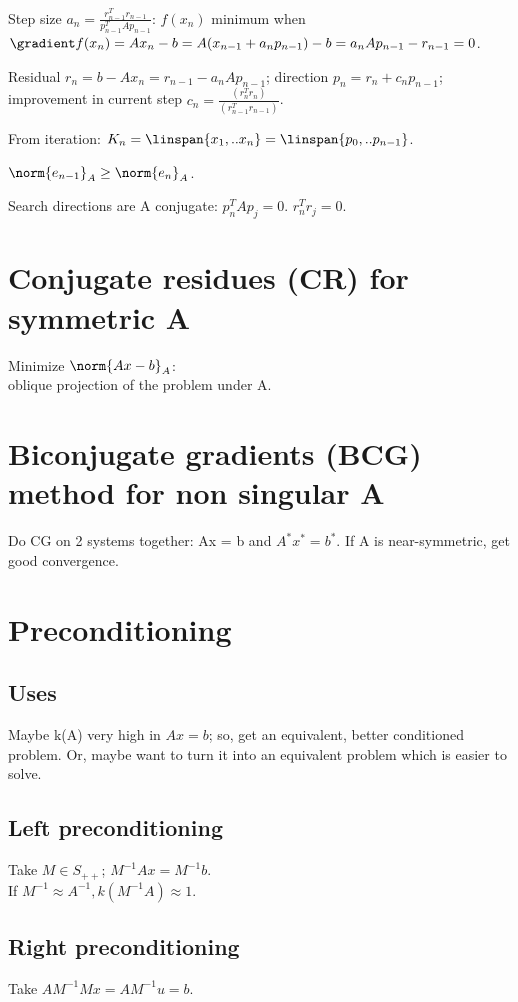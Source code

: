 \documentclass[oneside, article]{memoir}
\begin{document}
Step size $a_{n} = \frac{r_{n-1}^{T}r_{n-1}}{p_{n-1}^{T}Ap_{n-1}}$: $f(x_{n})$ minimum when $\gradient f(x_{n}) = Ax_{n} -b = A(x_{n-1} + a_{n}p_{n-1}) - b  = a_{n}Ap_{n-1} - r_{n-1}= 0$.

Residual $r_{n} = b - Ax_{n} = r_{n-1} - a_{n}Ap_{n-1}$; direction $p_{n} = r_{n} + c_{n}p_{n-1}$; improvement in current step $c_{n} = \frac{(r_{n}^{T}r_{n})}{(r_{n-1}^{T}r_{n-1})}$.


From iteration: $K_{n} = \linspan{x_{1}, .. x_{n}} = \linspan{p_{0}, .. p_{n-1}}$.

$\norm{e_{n-1}}_{A} \geq \norm{e_{n}}_{A}$. \why

Search directions are A conjugate: $p_{n}^{T}Ap_{j} = 0$. \why $r_{n}^{T}r_{j}=0$. \why

\section{Conjugate residues (CR) for symmetric A}
Minimize $\norm{Ax-b}_{A}$: \\
oblique projection of the problem under A.

\tbc

\section{Biconjugate gradients (BCG) method for non singular A}
Do CG on 2 systems together: Ax = b and $A^{*}x^{*} = b^{*}$. If A is near-symmetric, get good convergence.

\tbc

\section{Preconditioning}
\subsection{Uses}
Maybe k(A) very high in $Ax = b$; so, get an equivalent, better conditioned problem. Or, maybe want to turn it into an equivalent problem which is easier to solve.

\subsection{Left preconditioning}
Take $M \in S_{++}$; $M^{-1}Ax = M^{-1}b$. \\
If $M^{-1} \approx A^{-1}, k(M^{-1}A) \approx 1$.

\subsection{Right preconditioning}
Take $AM^{-1}Mx = AM^{-1}u = b$.
\end{document}
